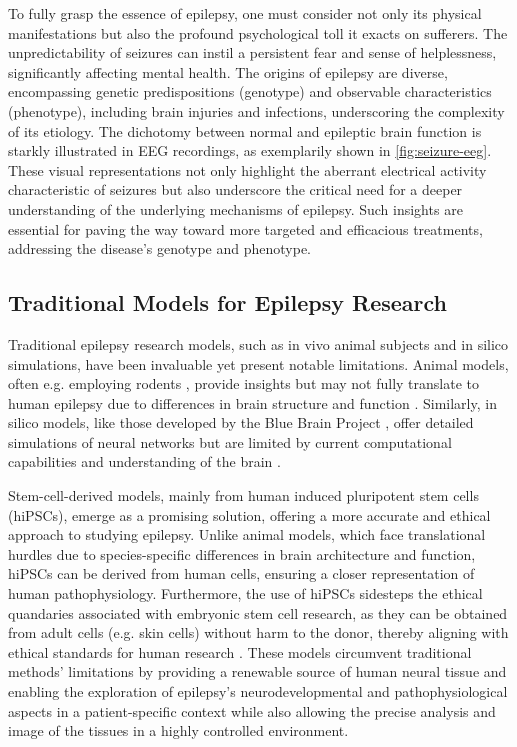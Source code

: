 \documentclass[10pt]{article}
\begin{document}
\begin{sloppypar}
  To fully grasp the essence of epilepsy, one must consider not only its physical manifestations but also the profound psychological toll it exacts on sufferers. The unpredictability of seizures can instil a persistent fear and sense of helplessness, significantly affecting mental health. The origins of epilepsy are diverse, encompassing genetic predispositions (genotype) and observable characteristics (phenotype), including brain injuries and infections, underscoring the complexity of its etiology.
  The dichotomy between normal and epileptic brain function is starkly illustrated in EEG recordings, as exemplarily shown in \autoref{fig:seizure-eeg}. These visual representations not only highlight the aberrant electrical activity characteristic of seizures but also underscore the critical need for a deeper understanding of the underlying mechanisms of epilepsy. Such insights are essential for paving the way toward more targeted and efficacious treatments, addressing the disease's genotype and phenotype.

  \subsection{Traditional Models for Epilepsy Research}
  \label{sec:traditional-models-for-epilepsy-research}

  Traditional epilepsy research models, such as in vivo animal subjects and in silico simulations, have been invaluable yet present notable limitations. Animal models, often e.g. employing rodents \citep{wang_animal_2022}, provide insights but may not fully translate to human epilepsy due to differences in brain structure and function \citep{kandratavicius_animal_2014}. Similarly, in silico models, like those developed by the Blue Brain Project \citep{markram_blue_2006}, offer detailed simulations of neural networks but are limited by current computational capabilities and understanding of the brain \citep{mirza_integrative_2016}.

  Stem-cell-derived models, mainly from human induced pluripotent stem cells (hiPSCs), emerge as a promising solution, offering a more accurate and ethical approach to studying epilepsy. Unlike animal models, which face translational hurdles due to species-specific differences in brain architecture and function, hiPSCs can be derived from human cells, ensuring a closer representation of human pathophysiology. Furthermore, the use of hiPSCs sidesteps the ethical quandaries associated with embryonic stem cell research, as they can be obtained from adult cells (e.g. skin cells) without harm to the donor, thereby aligning with ethical standards for human research \citep{takahashi_induction_2006}. These models circumvent traditional methods’ limitations by providing a renewable source of human neural tissue and enabling the exploration of epilepsy’s neurodevelopmental and pathophysiological aspects in a patient-specific context while also allowing the precise analysis and image of the tissues in a highly controlled environment.


\end{sloppypar}
\end{document}

